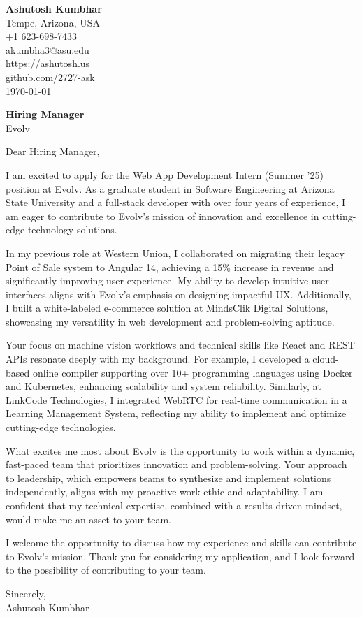 \documentclass[11pt]{article}
\begin{document}
\begin{flushleft}
\textbf{Ashutosh Kumbhar} \\
Tempe, Arizona, USA \\
+1 623-698-7433 \\
akumbha3@asu.edu \\
https://ashutosh.us \\
github.com/2727-ask \\
\today
\end{flushleft}

\vspace{0.5em}

\textbf{Hiring Manager} \\
Evolv \\

\vspace{1em}

Dear Hiring Manager,

I am excited to apply for the Web App Development Intern (Summer '25) position at Evolv. As a graduate student in Software Engineering at Arizona State University and a full-stack developer with over four years of experience, I am eager to contribute to Evolv’s mission of innovation and excellence in cutting-edge technology solutions.

In my previous role at Western Union, I collaborated on migrating their legacy Point of Sale system to Angular 14, achieving a 15\% increase in revenue and significantly improving user experience. My ability to develop intuitive user interfaces aligns with Evolv’s emphasis on designing impactful UX. Additionally, I built a white-labeled e-commerce solution at MindsClik Digital Solutions, showcasing my versatility in web development and problem-solving aptitude.

Your focus on machine vision workflows and technical skills like React and REST APIs resonate deeply with my background. For example, I developed a cloud-based online compiler supporting over 10+ programming languages using Docker and Kubernetes, enhancing scalability and system reliability. Similarly, at LinkCode Technologies, I integrated WebRTC for real-time communication in a Learning Management System, reflecting my ability to implement and optimize cutting-edge technologies.

What excites me most about Evolv is the opportunity to work within a dynamic, fast-paced team that prioritizes innovation and problem-solving. Your approach to leadership, which empowers teams to synthesize and implement solutions independently, aligns with my proactive work ethic and adaptability. I am confident that my technical expertise, combined with a results-driven mindset, would make me an asset to your team.

I welcome the opportunity to discuss how my experience and skills can contribute to Evolv’s mission. Thank you for considering my application, and I look forward to the possibility of contributing to your team.

Sincerely, \\
Ashutosh Kumbhar
\end{document}

